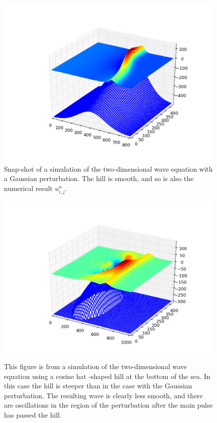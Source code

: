 \documentclass[twoside]{article}
\begin{document}
\begin{figure} 
  \centering
  \includegraphics[scale=0.4]{gustavs_codes/movie_2dwave_gaussian/figure.pdf}
  \caption{Snap-shot of a simulation of the two-dimensional wave equation with a Gaussian perturbation. The hill is smooth, and so is also the numerical result $u_{i, j}^{n}$.} \label{fig:wave_2d_gaussian}
\end{figure}

\begin{figure} 
  \centering
  \includegraphics[scale=0.4]{gustavs_codes/movie_2dwave_coshat/figure.pdf}
  \caption{This figure is from a simulation of the two-dimensional wave equation using a cosine hat -shaped hill at the bottom of the sea. In this case the hill is steeper than in the case with the Gaussian perturbation. The resulting wave is clearly less smooth, and there are oscillations in the region of the perturbation after the main pulse has passed the hill.}  \label{fig:wave_2d_coshat}
\end{figure}
\end{document}
